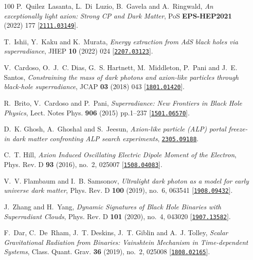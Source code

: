 \begin{thebibliography}{100}
P.~Quilez~Lasanta, L.~Di~Luzio, B.~Gavela and A.~Ringwald,  {\em {An
  exceptionally light axion: Strong CP and Dark Matter}}, PoS {\bf EPS-HEP2021}
  (2022) 177 [\href{http://www.arXiv.org/abs/2111.03149}{{\tt 2111.03149}}].

T.~Ishii, Y.~Kaku and K.~Murata,  {\em {Energy extraction from AdS black holes
  via superradiance}}, JHEP {\bf 10} (2022) 024
  [\href{http://www.arXiv.org/abs/2207.03123}{{\tt 2207.03123}}].

V.~Cardoso, O.~J.~C. Dias, G.~S. Hartnett, M.~Middleton, P.~Pani and J.~E.
  Santos,  {\em {Constraining the mass of dark photons and axion-like particles
  through black-hole superradiance}}, JCAP {\bf 03} (2018) 043
  [\href{http://www.arXiv.org/abs/1801.01420}{{\tt 1801.01420}}].

R.~Brito, V.~Cardoso and P.~Pani,  {\em {Superradiance}: {New Frontiers in
  Black Hole Physics}}, Lect. Notes Phys. {\bf 906} (2015) pp.1--237
  [\href{http://www.arXiv.org/abs/1501.06570}{{\tt 1501.06570}}].

D.~K. Ghosh, A.~Ghoshal and S.~Jeesun,  {\em {Axion-like particle (ALP) portal
  freeze-in dark matter confronting ALP search experiments}},
  \href{http://www.arXiv.org/abs/2305.09188}{{\tt 2305.09188}}.

C.~T. Hill,  {\em {Axion Induced Oscillating Electric Dipole Moment of the
  Electron}}, Phys. Rev. D {\bf 93} (2016), no.~2, 025007
  [\href{http://www.arXiv.org/abs/1508.04083}{{\tt 1508.04083}}].

V.~V. Flambaum and I.~B. Samsonov,  {\em {Ultralight dark photon as a model for
  early universe dark matter}}, Phys. Rev. D {\bf 100} (2019), no.~6, 063541
  [\href{http://www.arXiv.org/abs/1908.09432}{{\tt 1908.09432}}].

J.~Zhang and H.~Yang,  {\em {Dynamic Signatures of Black Hole Binaries with
  Superradiant Clouds}}, Phys. Rev. D {\bf 101} (2020), no.~4, 043020
  [\href{http://www.arXiv.org/abs/1907.13582}{{\tt 1907.13582}}].

F.~Dar, C.~De~Rham, J.~T. Deskins, J.~T. Giblin and A.~J. Tolley,  {\em {Scalar
  Gravitational Radiation from Binaries: Vainshtein Mechanism in Time-dependent
  Systems}}, Class. Quant. Grav. {\bf 36} (2019), no.~2, 025008
  [\href{http://www.arXiv.org/abs/1808.02165}{{\tt 1808.02165}}].


\end{thebibliography}
